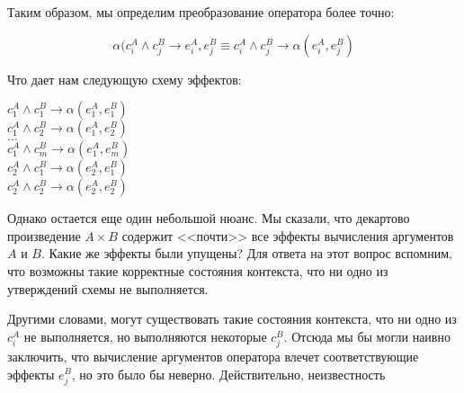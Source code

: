 Таким образом, мы определим преобразование оператора более точно:

$$ \alpha(c^A_i \land c^B_j \rightarrow e^A_i, e^B_j \equiv c^A_i \land c^B_j \rightarrow \alpha(e^A_i, e^B_j) $$

Что дает нам  следующую схему эффектов:

{
    $c^A_1 \land c^B_1 \rightarrow \alpha(e^A_1, e^B_1)$ \\
    $c^A_1 \land c^B_2 \rightarrow \alpha(e^A_1, e^B_2)$ \\
    $\ldots$ \\
    $c^A_1 \land c^B_m \rightarrow \alpha(e^A_1, e^B_m)$ \\
    $c^A_2 \land c^B_1 \rightarrow \alpha(e^A_2, e^B_1)$ \\
    $c^A_2 \land c^B_2 \rightarrow \alpha(e^A_2, e^B_2)$ \\
}{}

Однако остается еще один небольшой нюанс. Мы сказали, что декартово произведение $A \times B$ содержит <<почти>> все эффекты вычисления аргументов $A$ и $B$. Какие же эффекты были упущены? Для ответа на этот вопрос вспомним, что возможны такие корректные состояния контекста, что ни одно из утверждений схемы не выполняется.

Другими словами, могут существовать такие состояния контекста, что ни одно из $c^A_i$ не выполняется, но выполняются некоторые $c^B_j$. Отсюда мы бы могли наивно заключить, что вычисление аргументов оператора влечет соответствующие эффекты $e^B_j$, но это было бы неверно. Действительно, неизвестность 